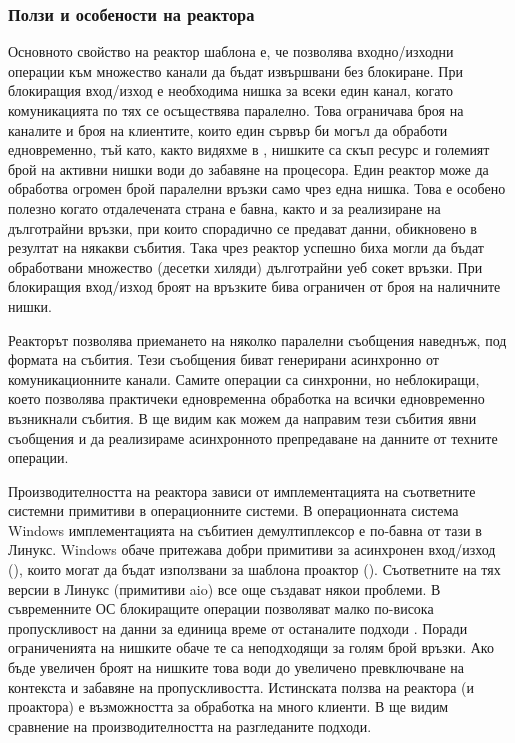 \subsubsection{Ползи и особености на реактора}

Основното свойство на реактор шаблона е, че позволява входно/изходни операции към множество канали да бъдат извършвани без блокиране. При блокиращия вход/изход е необходима нишка за всеки един канал, когато комуникацията по тях се осъществява паралелно. Това ограничава броя на каналите и броя на клиентите, които един сървър би могъл да обработи едновременно, тъй като, както видяхме в , нишките са скъп ресурс и големият брой на активни нишки води до забавяне на процесора. Един реактор може да обработва огромен брой паралелни връзки само чрез една нишка. Това е особено полезно когато отдалечената страна е бавна, както и за реализиране на дълготрайни връзки, при които спорадично се предават данни, обикновено в резултат на някакви събития. Така чрез реактор успешно биха могли да бъдат обработвани множество (десетки хиляди) дълготрайни уеб сокет връзки. При блокиращия вход/изход броят на връзките бива ограничен от броя на наличните нишки.

Реакторът позволява приемането на няколко паралелни съобщения наведнъж, под формата на събития. Тези съобщения биват генерирани асинхронно от комуникационните канали. Самите операции са синхронни, но неблокиращи, което позволява практичеки едновременна обработка на всички едновременно възникнали събития. В  ще видим как можем да направим тези събития явни съобщения и да реализираме асинхронното препредаване на данните от техните операции.

Производителността на реактора зависи от имплементацията на съответните системни примитиви в операционните системи. В операционната система Windows имплементацията на събитиен демултиплексор е по-бавна от тази в Линукс. Windows обаче притежава добри примитиви за асинхронен вход/изход (), които могат да бъдат използвани за шаблона проактор (). Съответните на тях версии в Линукс (примитиви aio) все още създават някои проблеми. В съвременните ОС блокиращите операции позволяват малко по-висока пропускливост на данни за единица време от останалите подходи \cite{tyma2008ThousandOfThreads}. Поради ограниченията на нишките обаче те са неподходящи за голям брой връзки. Ако бъде увеличен броят на нишките това води до увеличено превключване на контекста и забавяне на пропускливостта. Истинската ползва на реактора (и проактора) е възможността за обработка на много клиенти. В  ще видим сравнение на производителността на разгледаните подходи.

